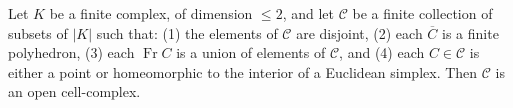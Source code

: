 Let $K$ be a finite complex, of dimension $\leqslant 2$, and let $\mathcal{C}$ be a finite collection of subsets of $|K|$ such that: (1) the elements of $\mathcal{C}$ are disjoint, (2) each $\overline{C}$ is a finite polyhedron, (3) each $\operatorname{Fr} C$ is a union of elements of $\mathcal{C}$, and (4) each $C \in \mathcal{C}$ is either a point or homeomorphic to the interior of a Euclidean simplex. Then $\mathcal{C}$ is an open cell-complex.
